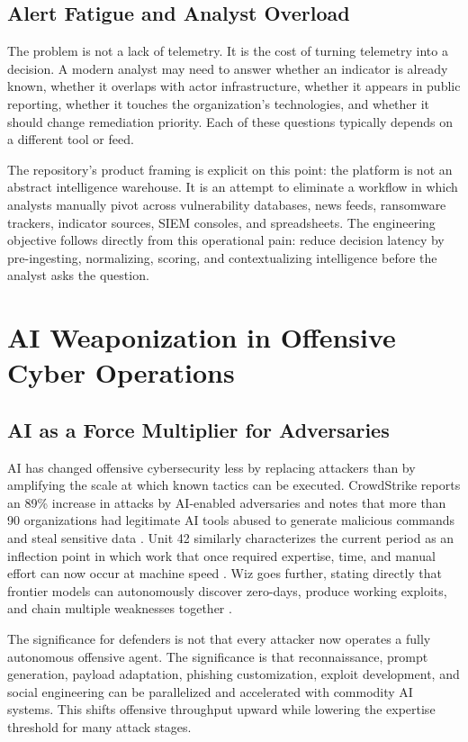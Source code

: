 \subsection{Alert Fatigue and Analyst Overload}
The problem is not a lack of telemetry. It is the cost of turning telemetry into a decision. A modern analyst may need to answer whether an indicator is already known, whether it overlaps with actor infrastructure, whether it appears in public reporting, whether it touches the organization's technologies, and whether it should change remediation priority. Each of these questions typically depends on a different tool or feed.

The repository's product framing is explicit on this point: the platform is not an abstract intelligence warehouse. It is an attempt to eliminate a workflow in which analysts manually pivot across vulnerability databases, news feeds, ransomware trackers, indicator sources, SIEM consoles, and spreadsheets. The engineering objective follows directly from this operational pain: reduce decision latency by pre-ingesting, normalizing, scoring, and contextualizing intelligence before the analyst asks the question.

\section{AI Weaponization in Offensive Cyber Operations}
\subsection{AI as a Force Multiplier for Adversaries}
AI has changed offensive cybersecurity less by replacing attackers than by amplifying the scale at which known tactics can be executed. CrowdStrike reports an 89\% increase in attacks by AI-enabled adversaries and notes that more than 90 organizations had legitimate AI tools abused to generate malicious commands and steal sensitive data \cite{crowdstrike_gtr_2026}. Unit 42 similarly characterizes the current period as an inflection point in which work that once required expertise, time, and manual effort can now occur at machine speed \cite{unit42_frontier_ai_2026}. Wiz goes further, stating directly that frontier models can autonomously discover zero-days, produce working exploits, and chain multiple weaknesses together \cite{wiz_ai_readiness_2026}.

The significance for defenders is not that every attacker now operates a fully autonomous offensive agent. The significance is that reconnaissance, prompt generation, payload adaptation, phishing customization, exploit development, and social engineering can be parallelized and accelerated with commodity AI systems. This shifts offensive throughput upward while lowering the expertise threshold for many attack stages.


